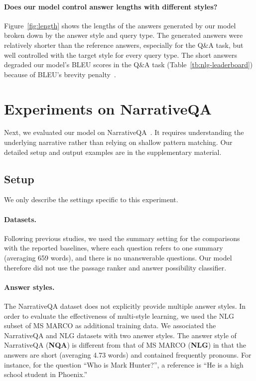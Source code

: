 \documentclass[11pt,a4paper]{article}
\theoremstyle{mydef}
\theoremstyle{myprob}
\begin{document}
\paragraph{Does our model control answer lengths with different styles?}
Figure~\ref{fig:length} shows the lengths of the answers generated by our model broken down by the answer style and query type.
The generated answers were relatively shorter than the reference answers, especially for the Q\&A task, but well controlled with the target style for every query type.  
The short answers degraded our model's BLEU scores in the 
Q\&A task (Table~\ref{tb:nlg-leaderboard}) 
because of BLEU's brevity penalty~\cite{PapineniRWZ02}.

\section{Experiments on NarrativeQA}

Next, we evaluated our model on NarrativeQA~\cite{KociskySBDHMG18}. 
It requires understanding the underlying narrative rather than relying on shallow pattern matching. 
Our detailed setup and output examples are in the supplementary material.

\subsection{Setup}
We only describe the settings specific to this experiment.

\paragraph{Datasets.}
Following previous studies, we used the summary setting for the comparisons with the reported baselines, where each question refers to one summary (averaging 659 words), and there is no unanswerable questions.
Our model therefore did not use the passage ranker and answer possibility classifier. 

\paragraph{Answer styles.}
The NarrativeQA dataset does not explicitly provide multiple answer styles.
In order to evaluate the effectiveness of multi-style learning, we used the NLG subset of MS MARCO as additional training data.
We associated the NarrativeQA and 
NLG datasets with two answer styles. 
The answer style of NarrativeQA (\textbf{NQA}) is different from that of MS MARCO (\textbf{NLG}) in that the answers are short (averaging 4.73 words) and contained frequently pronouns.
For instance, for the question ``Who is Mark Hunter?'', 
a reference is ``He is a high school student in Phoenix.''
\end{document}
